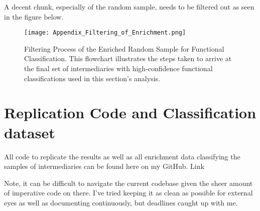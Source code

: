 A decent chunk, especially of the random sample, needs to be filtered out as seen in the figure below.

\begin{figure}[htbp]
    \centering
    \texttt{[image: Appendix\_Filtering\_of\_Enrichment.png]}
    \caption{Filtering Process of the Enriched Random Sample for Functional Classification. This flowchart illustrates the steps taken to arrive at the final set of intermediaries with high-confidence functional classifications used in this section's analysis.}
    \label{fig:appendix_filtering_enrichment}
\end{figure}


\section{Replication Code and Classification dataset}

All code to replicate the results as well as all enrichment data classifying the samples of intermediaries can be found here on my GitHub. Link

Note, it can be difficult to navigate the current codebase given the sheer amount of imperative code on there. I've tried keeping it as clean as possible for external eyes as well as documenting continuously, but deadlines caught up with me.





